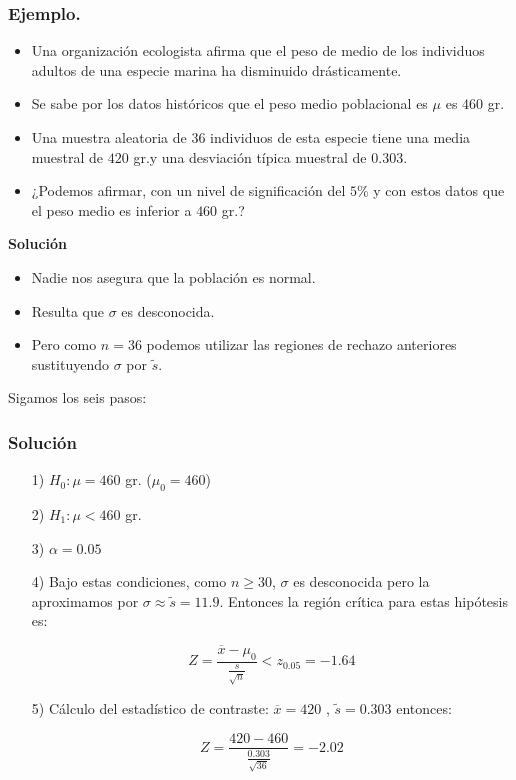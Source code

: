 \begin{frame}
\frametitle{Ejemplo.}
\begin{itemize}
\item  Una organización ecologista afirma que el peso de medio de los individuos adultos de una especie marina ha disminuido drásticamente.
\item  Se sabe por los datos históricos que el peso  medio poblacional es $\mu$ es $460$ gr.
\item  Una muestra aleatoria de 36  individuos de esta especie tiene una media muestral de $420$ gr.y una desviación típica muestral de $0.303$.
\item  ¿Podemos afirmar, con un nivel de significación del $5$\% y con estos datos que  el peso medio es inferior a $460$ gr.?
\end{itemize}
\end{frame}

\begin{frame}
\textbf{Solución}

\begin{itemize}
\item Nadie nos asegura que la población es normal.
\item Resulta que $\sigma$ es desconocida.
\item Pero como $n=36$ podemos utilizar las regiones de rechazo anteriores sustituyendo $\sigma$ por $\tilde{s}$.
\end{itemize}
Sigamos los seis pasos:
\end{frame}
\begin{frame}
\frametitle{Solución}
\begin{itemize}
\item[1)] $H_{0}:\mu=460$ gr. ($\mu_{0}=460$)  
\item[2)] $H_{1}:\mu<460$ gr.  
\item[3)] $\alpha=0.05$  
\item[4)] Bajo estas condiciones, como $n\geq 30$, $\sigma$ es desconocida pero la aproximamos por $\sigma\approx \tilde{s}=11.9$.
 Entonces la región crítica para estas hipótesis es:

 $$Z=\frac{\overline{x}-\mu_{0}}{\frac{s}{\sqrt{n}}}<z_{0.05}=-1.64$$

 \item[5)] Cálculo del estadístico de contraste:
 $\overline{x}=420$ , $\tilde{s}=0.303$  entonces:

 $$Z=\frac{420-460}{\frac{0.303}{\sqrt{36}}}=-2.02$$
\end{itemize}
\end{frame}

